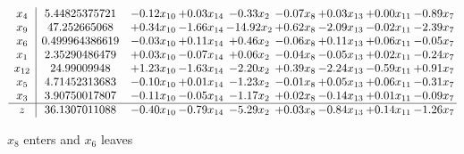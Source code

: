 \documentclass[8pt]{article}
\begin{document}
 \[\begin{array}{c| c c@{\hskip 2pt} c@{\hskip 2pt} c@{\hskip 2pt} c@{\hskip 2pt} c@{\hskip 2pt} c@{\hskip 2pt} c@{\hskip 2pt} }
 x_{4}   &  5.44825375721 & -0.12 x_{10} & +  0.03 x_{14} & -0.33 x_{2} & -0.07 x_{8} & +  0.03 x_{13} & +  0.00 x_{11} & -0.89 x_{7}\\
 x_{9}   &  47.252665068 & +  0.34 x_{10} & -1.66 x_{14} & -14.92 x_{2} & +  0.62 x_{8} & -2.09 x_{13} & -0.02 x_{11} & -2.39 x_{7}\\
 x_{6}   &  0.499964386619 & -0.03 x_{10} & +  0.11 x_{14} & +  0.46 x_{2} & -0.06 x_{8} & +  0.11 x_{13} & +  0.06 x_{11} & -0.05 x_{7}\\
 x_{1}   &  2.35290486479 & +  0.03 x_{10} & -0.07 x_{14} & +  0.06 x_{2} & -0.04 x_{8} & -0.05 x_{13} & +  0.02 x_{11} & -0.24 x_{7}\\
 x_{12}   &  24.99009948 & +  1.23 x_{10} & -1.63 x_{14} & -2.20 x_{2} & +  0.39 x_{8} & -2.24 x_{13} & -0.59 x_{11} & +  0.91 x_{7}\\
 x_{5}   &  4.71452313683 & -0.10 x_{10} & +  0.01 x_{14} & -1.23 x_{2} & -0.01 x_{8} & +  0.05 x_{13} & +  0.06 x_{11} & -0.31 x_{7}\\
 x_{3}   &  3.90750017807 & -0.11 x_{10} & -0.05 x_{14} & -1.17 x_{2} & +  0.02 x_{8} & -0.14 x_{13} & +  0.01 x_{11} & -0.09 x_{7}\\
\hline
z    &  36.1307011088 & -0.40 x_{10} & -0.79 x_{14} & -5.29 x_{2} & +  0.03 x_{8} & -0.84 x_{13} & +  0.14 x_{11} & -1.26 x_{7}\\
\end{array}\]


 $ x_{8} $ enters and $ x_{6} $ leaves 
\end{document}
